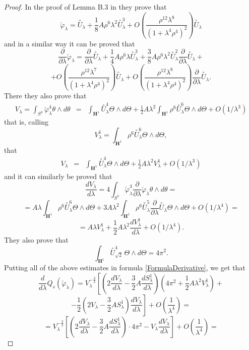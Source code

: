 \documentclass[10pt,a4paper]{amsart}
\renewcommand{\phi}{\varphi}
\newcommand{\de}{\partial}
\renewcommand{\H}{\mathbf{H}}
\renewcommand{\l}{\lambda }
\newcommand{\var}{\varphi }
\renewcommand{\th }{\theta }
\begin{document}
\begin{proof}
 In the proof of Lemma B.3 in \cite{CMY2} they prove that
$$\breve{\var}_\l = \overset{\circ}{U}_\l  + \frac 18 A \rho^6 \l^2 \overset{\circ}{U}_\l^3 
+ O \left( \frac{\rho^{12} \l^8}{(1 + \l^4 \rho^4)^2}  \right) \overset{\circ}{U}_\l$$
 and in a similar way it can be proved that
$$\frac{\de}{\de\lambda}\breve{\var}_\l = \frac{\de}{\de\lambda}\overset{\circ}{U}_\l  + \frac 14 A \rho^6 \l\overset{\circ}{U}_\l^3 + \frac{3}{8} A \rho^6 \l^2 \overset{\circ}{U}_\l^2\frac{\de}{\de\lambda}\overset{\circ}{U}_\l+$$
$$+ O \left( \frac{\rho^{12} \l^7}{(1 + \l^4 \rho^4)^2}  \right) \overset{\circ}{U}_\l + O \left( \frac{\rho^{12} \l^8}{(1 + \l^4 \rho^4)^2}  \right) \frac{\de}{\de\lambda}\overset{\circ}{U}_\l.$$
There they also prove that
\begin{eqnarray*}
  V_{\lambda} =\int_{S^3} \breve{\var}_\l^4 \th \wedge d \th  & = & \int_{\H^1} \overset{\circ}{U}_\l^4 \Theta\wedge d\Theta  + \frac{1}{2} A \l^2 \int_{\H^1} \rho^6 \overset{\circ}{U}_\l^6 \Theta\wedge d\Theta + O(1/\l^3)
\end{eqnarray*}
that is, calling
$$V_{\lambda}^1= \int_{\H^1} \rho^6 \overset{\circ}{U}_\l^6\Theta\wedge d\Theta ,$$
that
\begin{eqnarray*}
  V_{\lambda} & = & \int_{\H^1} \overset{\circ}{U}_\l^4 \Theta\wedge d\Theta  + \frac{1}{2} A \l^2 V_{\lambda}^1  + O(1/\l^3)
\end{eqnarray*}
and it can similarly be proved that
$$\frac{dV_{\lambda}}{d\lambda} = 4\int_{S^3} \breve{\var}_\l^3\frac{\de}{\de\lambda}\breve{\var}_\l \th \wedge d \th =$$
$$= A \l \int_{\H^1} \rho^6 \overset{\circ}{U}_\l^6 \Theta\wedge d\Theta + 
  3 A \l^2 \int_{\H^1} \rho^6 \overset{\circ}{U}_\l^5\frac{\de}{\de\lambda}\overset{\circ}{U}_\l \Theta\wedge d\Theta
  + O(1/\l^4)=$$
 $$= A\lambda V_{\lambda}^1 + \frac{1}{2}A\lambda^2\frac{dV_{\lambda}^1}{d\lambda} +O(1/\l^4).$$
They also prove that
$$\int_{\H^1} \overset{\circ}{U}_{\sqrt{2}}^4 \, \Theta\wedge d\Theta
= 4 \pi^2. $$
Putting all of the above estimates in formula \eqref{FormulaDerivative}, we get that
$$\frac{d}{d\lambda}Q_s(\breve\phi_\lambda)= V_{\lambda}^{-\frac{3}{2}}\left[\left( 2\frac{dV_{\lambda}}{d\lambda} - \frac{3}{2}A\frac{dS^1_{\lambda}}{d\lambda} \right)\left(4\pi^2 +\frac{1}{2} A \l^2 V_{\lambda}^1 \right) + \right.$$
$$\left.-\frac{1}{2}\left( 2V_{\lambda} -\frac{3}{2}AS^1_{\lambda}\right)\frac{dV_{\lambda}}{d\lambda}\right] +O\left(\frac{1}{\lambda^4}\right) =$$
$$= V_{\lambda}^{-\frac{3}{2}}\left[\left(2\frac{dV_{\lambda}}{d\lambda} - \frac{3}{2}A\frac{dS^1_{\lambda}}{d\lambda} \right) \cdot 4\pi^2-V_{\lambda}\frac{dV_{\lambda}}{d\lambda}\right] +O\left(\frac{1}{\lambda^4}\right) =$$

\end{proof}
\end{document}
